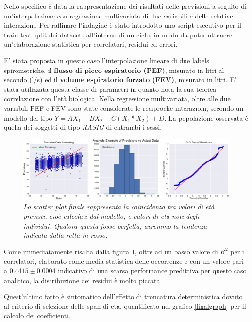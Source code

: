 \documentclass[12pt,openright,twoside,a4paper]{book}
\begin{document}
Nello specifico è data la rappresentazione dei risultati delle previsioni a seguito di un'interpolazione con regressione multivariata di due variabili e delle relative interazioni.
Per raffinare l'indagine è stato introdotto uno script esecutivo per il train-test split dei datasets all'interno di un ciclo, in modo da poter ottenere un'elaborazione statistica per correlatori, residui ed errori.

E' stata proposta in questo caso l'interpolazione lineare di due labels spirometriche, il \textbf{flusso di picco espiratorio (PEF)}, misurato in litri al secondo (l/s) ed il \textbf{volume espiratorio forzato (FEV)}, misurato in litri. 
E' stata utilizzata questa classe di parametri in quanto nota la sua teorica correlazione con l'età biologica. 
Nella regressione multivariata, oltre alle due variabili PEF e FEV sono state considerate le reciproche interazioni, secondo un modello del tipo $Y=AX_1+BX_2+C(X_1*X_2)+D$.
La popolazione osservata è quella dei soggetti di tipo \textit{RASIG} di entrambi i sessi.

\begin{figure}[!h]
\centering
\includegraphics[width=1.2\linewidth]{mulregression}
\caption{\textit{Lo scatter plot finale rappresenta la coincidenza tra valori di età previsti, cioè calcolati dal modello, e valori di età noti degli individui. Qualora questa fosse perfetta, avremmo la tendenza indicata dalla retta in rosso.}}
\label{mulregression}
\end{figure}

Come immediatamente risalta dalla figura \ref{mulregression}, oltre ad un basso valore di $R^2$ per i correlatori, elaborato come media statistica delle occorrenze e con un valore pari a $0.4415\pm0.0004$ indicativo di una scarsa performance predittiva per questo caso analitico, la distribuzione dei residui è molto piccata.

Quest'ultimo fatto è sintomatico dell'effetto di troncatura deterministica dovuto al criterio di selezione dello span di età, quantificato nel grafico \ref{finalgraph} per il calcolo dei coefficienti.
\end{document}
